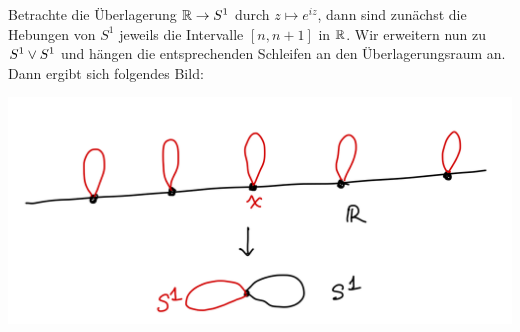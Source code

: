 \begin{example}
    Betrachte die Überlagerung $\mathbb{R} \to  S^1$ durch $z \mapsto e^{iz}$, dann sind zunächst die Hebungen von $S^1$ jeweils die Intervalle  $[n,n+1]$ in  $\mathbb{R}$. Wir erweitern nun zu $S^1 \vee S^1$ und hängen die entsprechenden Schleifen an den Überlagerungsraum an. Dann ergibt sich folgendes Bild:

    \begin{minipage}{\textwidth}
    \centering
    \includegraphics[scale=0.25]{figures/handdrawn/ueberlagerung-s1-wedge-s1}
    \end{minipage}
\end{example}

